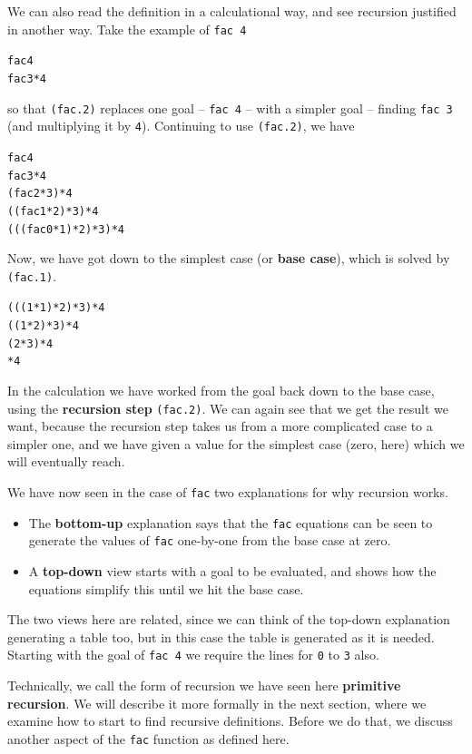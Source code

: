 We can also read the definition in a calculational way, and see
recursion justified in another way. Take the example of \texttt{fac 4}
\begin{alltt}
fac 4
\step fac 3 * 4
\end{alltt}
so that \texttt{(fac.2)} replaces one goal -- \texttt{fac 4} -- with a
simpler goal -- finding \texttt{fac 3} (and multiplying it by
\texttt{4}). Continuing to use \texttt{(fac.2)}, we have
\begin{alltt}
fac 4
\step fac 3 * 4
\step (fac 2 * 3) * 4
\step ((fac 1 * 2) * 3) * 4
\step (((fac 0 * 1) * 2) * 3) * 4
\end{alltt}
Now, we have got down to the simplest case (or \textbf{base case}),
which is solved by \texttt{(fac.1)}.
\begin{alltt}
\step (((1 * 1) * 2) * 3) * 4
\step ((1 * 2) * 3) * 4
\step (2 * 3) * 4
 * 4
\end{alltt}
In the calculation we have worked from the goal back down to the base
case, using the \textbf{recursion step}
 \texttt{(fac.2)}. We can again
see that we get the result we want, because the recursion step takes us
from a more complicated case to a simpler one, and we have given a value
for the simplest case (zero, here) which we will eventually reach.

We have now seen in the case of \texttt{fac} two explanations for why
recursion works. 
\begin{itemize}
\item{}
The \textbf{bottom-up} explanation says that the \texttt{fac} equations can be 
seen to generate the
values of \texttt{fac} one-by-one from the base case at zero. 
\item{}
A \textbf{top-down} view starts with a goal to be evaluated, and shows how
the equations simplify this until we hit the base case.
\end{itemize}
The two views here are related, since we can think of the top-down
explanation generating a table too, but in this case the table is
generated as it is needed. Starting with the goal of \texttt{fac 4} we
require the lines for \texttt{0} to \texttt{3} also.

Technically, we call the form of recursion we have seen here
\textbf{primitive recursion}.
 We will describe it more formally in the
next section, where we examine how to start to find recursive
definitions. Before we do that, we discuss another aspect of the
\texttt{fac} function as defined here.

